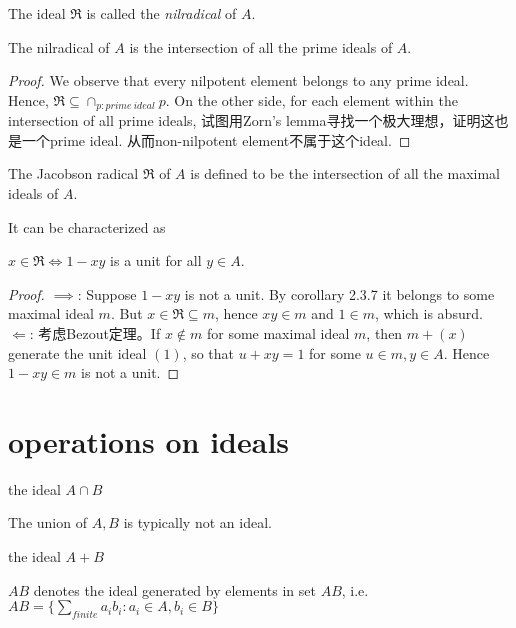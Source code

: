 \documentclass[11pt,fleqn]{book} %
\begin{document}
\begin{CJK}{UTF8}{gkai}
The ideal $\mathfrak{R}$ is called the {\it nilradical} of $A$.
\begin{proposition}
	The nilradical of $A$ is the intersection of all the prime ideals of $A$.
\end{proposition}
\begin{proof}
	We observe that every nilpotent element belongs to any prime ideal. Hence, $\mathfrak{R} \subseteq \cap_{p:prime \ ideal}p$.
	On the other side, for each element within the intersection of all prime ideals, 试图用Zorn's lemma寻找一个极大理想，证明这也是一个prime ideal. 从而non-nilpotent element不属于这个ideal.
\end{proof}

\begin{definition}
	 The Jacobson radical $\mathfrak{R}$ of $A$ is defined to be the intersection of all the maximal ideals of $A$.
\end{definition}
It can be characterized as
\begin{proposition}
	$x\in \mathfrak{R} \iff 1 - xy$ is a unit for all $y \in A$.
\end{proposition}
\begin{proof}
	$\implies$: Suppose $1-xy$ is not a unit. By corollary 2.3.7 it belongs to some maximal ideal $m$. But $x\in \mathfrak{R}\subseteq m$, hence $xy \in m$ and $1 \in m$, which is absurd. \\
	$\Leftarrow$: 考虑Bezout定理。If $x\notin m$ for some maximal ideal $m$, then $m + (x)$ generate the unit ideal $(1)$, so that $u + xy = 1$ for some $u \in m, y \in A$. Hence $1 - xy \in m$ is not a unit.
\end{proof}

\section{operations on ideals}
\begin{definition}
	[intersection] the ideal $A \cap B$
\end{definition}
\begin{remark}
	The union of $A, B$ is typically not an ideal.
\end{remark}

\begin{definition}
	[sum] the ideal $A + B$
\end{definition}

\begin{definition}
	[product] $AB$ denotes the ideal generated by elements in set $AB$, i.e. $AB = \{\sum_{finite}a_ib_i : a_i \in A, b_i \in B\}$	
\end{definition}


\end{CJK}
\end{document}
